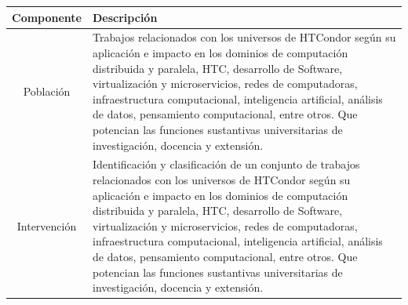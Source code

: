 \begin{table}[H]
	\centering
	\renewcommand{\arraystretch}{1.2} %
	\footnotesize %
	\begin{tabular}{|c|p{12cm}|} %
		\hline
		\textbf{Componente} & \textbf{Descripción}                                                                                                                                                                                                                                                                                                                                                                                                                                                                             \\ \hline

		Población           & Trabajos relacionados con los universos de HTCondor según su aplicación e impacto en los dominios de computación distribuida y paralela, HTC, desarrollo de Software, virtualización y microservicios, redes de computadoras, infraestructura computacional, inteligencia artificial, análisis de datos, pensamiento computacional, entre otros. Que potencian las funciones sustantivas universitarias de investigación, docencia y extensión.                                                  \\ \hline

		Intervención        & Identificación y clasificación de un conjunto de trabajos relacionados con los universos de HTCondor según su aplicación e impacto en los dominios de computación distribuida y paralela, HTC, desarrollo de Software, virtualización y microservicios, redes de computadoras, infraestructura computacional, inteligencia artificial, análisis de datos, pensamiento computacional, entre otros. Que potencian las funciones sustantivas universitarias de investigación, docencia y extensión. \\ \hline


\end{tabular}
\end{table}
